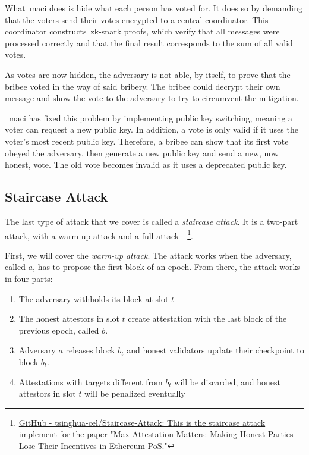 What~\gls{maci} does is hide what each person has voted for.
It does so by demanding that the voters send their votes encrypted to a central coordinator.
This coordinator constructs~\gls{zk-snark} proofs, which verify that all messages were processed correctly and that the final result corresponds to the sum of all valid votes.

As votes are now hidden, the adversary is not able, by itself, to prove that the bribee voted in the way of said bribery.
The bribee could decrypt their own message and show the vote to the adversary to try to circumvent the mitigation.

~\gls{maci} has fixed this problem by implementing public key switching, meaning a voter can request a new public key.
In addition, a vote is only valid if it uses the voter's most recent public key.
Therefore, a bribee can show that its first vote obeyed the adversary, then generate a new public key and send a new, now honest, vote.
The old vote becomes invalid as it uses a deprecated public key.

\subsection{Staircase Attack}\label{subsec:staircase-attack}
The last type of attack that we cover is called a \textit{staircase attack}.
It is a two-part attack, with a warm-up attack and a full attack~\cite{cryptoeprint:2023/1622}~\footnote{
\href{https://github.com/tsinghua-cel/Staircase-Attack}{GitHub - tsinghua-cel/Staircase-Attack: This is the staircase attack implement for the paper "Max Attestation Matters: Making Honest Parties Lose Their Incentives in Ethereum PoS."}}.

First, we will cover the \textit{warm-up attack}.
The attack works when the adversary, called $a$, has to propose the first block of an epoch.
From there, the attack works in four parts:
\begin{enumerate}
    \item The adversary withholds its block at slot $t$
    \item The honest attestors in slot $t$ create attestation with the last block of the previous epoch, called $b$.
    \item Adversary $a$ releases block $b_t$ and honest validators update their checkpoint to block $b_t$.
    \item Attestations with targets different from $b_t$ will be discarded, and honest attestors in slot $t$ will be penalized eventually
\end{enumerate}

